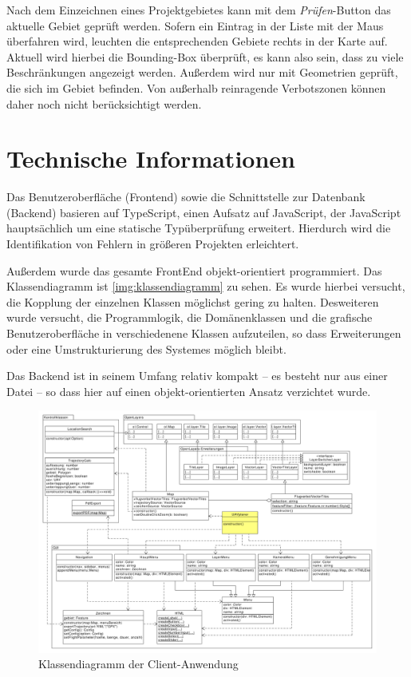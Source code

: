 \documentclass[a4paper,12pt,bibliography=totoc, listof=totoc,titlepage]{scrartcl}
\begin{document}
Nach dem Einzeichnen eines Projektgebietes kann mit dem \textit{Prüfen}-Button das aktuelle Gebiet geprüft werden. Sofern ein Eintrag in der Liste mit der Maus überfahren wird, leuchten die entsprechenden Gebiete rechts in der Karte auf. Aktuell wird hierbei die Bounding-Box überprüft, es kann also sein, dass zu viele Beschränkungen angezeigt werden. Außerdem wird nur mit Geometrien geprüft, die sich im Gebiet befinden. Von außerhalb reinragende Verbotszonen können daher noch nicht berücksichtigt werden.

\section{Technische Informationen}
\label{technische_information}

Das Benutzeroberfläche (Frontend) sowie die Schnittstelle zur Datenbank (Backend) basieren auf TypeScript, einen Aufsatz auf JavaScript, der JavaScript hauptsächlich um eine statische Typüberprüfung erweitert. Hierdurch wird die Identifikation von Fehlern in größeren Projekten erleichtert. \citep[S. 3]{typescript}

Außerdem wurde das gesamte FrontEnd objekt-orientiert programmiert. Das Klassendiagramm ist \autoref{img:klassendiagramm} zu sehen. Es wurde hierbei versucht, die Kopplung der einzelnen Klassen möglichst gering zu halten. Desweiteren wurde versucht, die Programmlogik, die Domänenklassen und die grafische Benutzeroberfläche in verschiedenene Klassen aufzuteilen, so dass Erweiterungen oder eine Umstrukturierung des Systemes möglich bleibt.

Das Backend ist in seinem Umfang relativ kompakt -- es besteht nur aus einer Datei -- so dass hier auf einen objekt-orientierten Ansatz verzichtet wurde.

\begin{figure} %
 \centering
 \includegraphics[width=1\textwidth]{./img/klassendiagramm.pdf}
\centering
 \caption{Klassendiagramm der Client-Anwendung} %
 \label{img:klassendiagramm} %
\end{figure}
\end{document}

